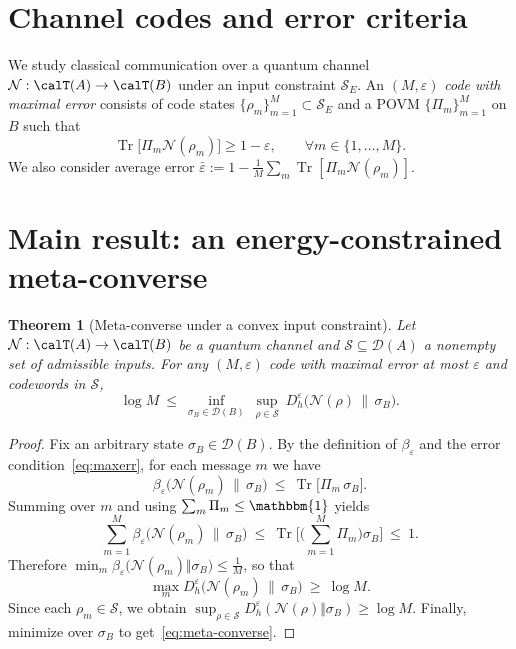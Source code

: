 \documentclass[11pt]{article}
\newtheorem{theorem}{Theorem}
\theoremstyle{definition}
\DeclareMathOperator{\Tr}{Tr}
\newcommand{\id}{\mathbbm{1}}
\newcommand{\Dheps}[1]{D_h^{#1}}
\newcommand{\calN}{\mathcal{N}}
\newcommand{\calD}{\mathcal{D}}
\newcommand{\calS}{\mathcal{S}}
\begin{document}
\section{Channel codes and error criteria}
We study classical communication over a quantum channel $\calN:\calT(A)\to\calT(B)$ under an input constraint $\calS_E$.
An $(M,\varepsilon)$ \emph{code with maximal error} consists of code states $\{\rho_m\}_{m=1}^M \subset \calS_E$ and a POVM $\{\Pi_m\}_{m=1}^M$ on $B$ such that
\begin{equation}\label{eq:maxerr}
\Tr\!\big[\Pi_m \calN(\rho_m)\big] \ge 1-\varepsilon, \qquad \forall m\in\{1,\ldots,M\}.
\end{equation}
We also consider average error $\bar\varepsilon := 1-\frac1M\sum_m \Tr[\Pi_m \calN(\rho_m)]$.

\section{Main result: an energy-constrained meta-converse}
\begin{theorem}[Meta-converse under a convex input constraint]\label{thm:metaconverse}
Let $\calN:\calT(A)\to\calT(B)$ be a quantum channel and $\calS\subseteq\calD(A)$ a nonempty set of admissible inputs.
For any $(M,\varepsilon)$ code with maximal error at most $\varepsilon$ and codewords in $\calS$,
\begin{equation}\label{eq:meta-converse}
\log M \ \le\ \inf_{\sigma_B\in\calD(B)}\ \sup_{\rho\in\calS}\ \Dheps{\varepsilon}\!\big(\calN(\rho)\,\big\|\,\sigma_B\big).
\end{equation}
\end{theorem}

\begin{proof}
Fix an arbitrary state $\sigma_B\in\calD(B)$.
By the definition of $\beta_\varepsilon$ and the error condition~\eqref{eq:maxerr}, for each message $m$ we have
\begin{equation}
\beta_\varepsilon\!\big(\calN(\rho_m)\,\big\|\,\sigma_B\big)
\ \le\ \Tr\!\big[\Pi_m\, \sigma_B\big].
\end{equation}
Summing over $m$ and using $\sum_m \Pi_m \le \id$ yields
\begin{equation}
\sum_{m=1}^M \beta_\varepsilon\!\big(\calN(\rho_m)\,\big\|\,\sigma_B\big)
\ \le\ \Tr\!\Big[\Big(\sum_{m=1}^M \Pi_m\Big)\sigma_B\Big]
\ \le\ 1.
\end{equation}
Therefore $\min_m \beta_\varepsilon\big(\calN(\rho_m)\Vert\sigma_B\big) \le \frac{1}{M}$, so that
\begin{equation}
\max_m \Dheps{\varepsilon}\!\big(\calN(\rho_m)\,\big\|\,\sigma_B\big)
\ \ge\ \log M.
\end{equation}
Since each $\rho_m\in\calS$, we obtain $\sup_{\rho\in\calS} \Dheps{\varepsilon}(\calN(\rho)\Vert\sigma_B) \ge \log M$.
Finally, minimize over $\sigma_B$ to get~\eqref{eq:meta-converse}.
\end{proof}
\end{document}

